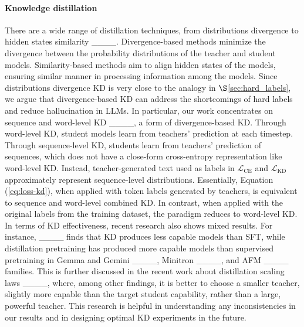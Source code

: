 \paragraph{Knowledge distillation}
There are a wide range of distillation techniques, from distributions divergence to hidden states similarity ____. Divergence-based methods minimize the divergence between the probability distributions of the teacher and student models. Similarity-based methods aim to align hidden states of the models, ensuring similar manner in processing information among the models. Since distributions divergence KD is very close to the analogy in $\S$\ref{sec:hard_labels}, we argue that divergence-based KD can address the shortcomings of hard labels and reduce hallucination in LLMs. 
In particular, our work concentrates on sequence and word-level KD ____, a form of divergence-based KD. Through word-level KD, student models learn from teachers' prediction at each timestep. Through sequence-level KD, students learn from teachers' prediction of sequences, which does not have a close-form cross-entropy representation like word-level KD. Instead, teacher-generated text used as labels in $\mathcal{L}_{\text{CE}}$ and $\mathcal{L}_{\text{KD}}$ approximately represent sequence-level distributions. Essentially, Equation (\ref{eq:loss-kd}), when applied with token labels generated by teachers, is equivalent to sequence and word-level combined KD. In contrast, when applied with the original labels from the training dataset, the paradigm reduces to word-level KD.
In terms of KD effectiveness, recent research also shows mixed results. For instance, ____ finds that KD produces less capable models than SFT, while distillation pretraining has produced more capable models than supervised pretraining in Gemma and Gemini ____, Minitron ____, and AFM ____ families. This is further discussed in the recent work about distillation scaling laws ____, where, among other findings, it is better to choose a smaller teacher, slightly more capable than the target student capability, rather than a large, powerful teacher. This research is helpful in understanding any inconsistencies in our results and in designing optimal KD experiments in the future.